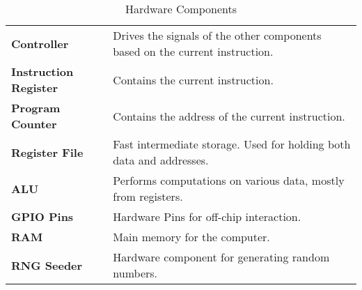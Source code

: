 \newcommand{\hw}[2]{%
	\textbf{#1} & #2 \\%
	\hline%
}
\begin{table}[H]
	\begin{tabularx}{\textwidth}{| a | x |}
		\hline
		 &  \\
		\hline
		\hw{Controller}{Drives the signals of the other components based on the current instruction.}
		\hw{Instruction Register}{Contains the current instruction.}
		\hw{Program Counter}{Contains the address of the current instruction.}
		\hw{Register File}{Fast intermediate storage. Used for holding both data and addresses.}
		\hw{ALU}{Performs computations on various data, mostly from registers.}
		\hw{GPIO Pins}{Hardware Pins for off-chip interaction.}
		\hw{RAM}{Main memory for the computer.}
		\hw{RNG Seeder}{Hardware component for generating random numbers.}
	\end{tabularx}
	\label{Tab:hardware}
	\caption{Hardware Components}
\end{table}

